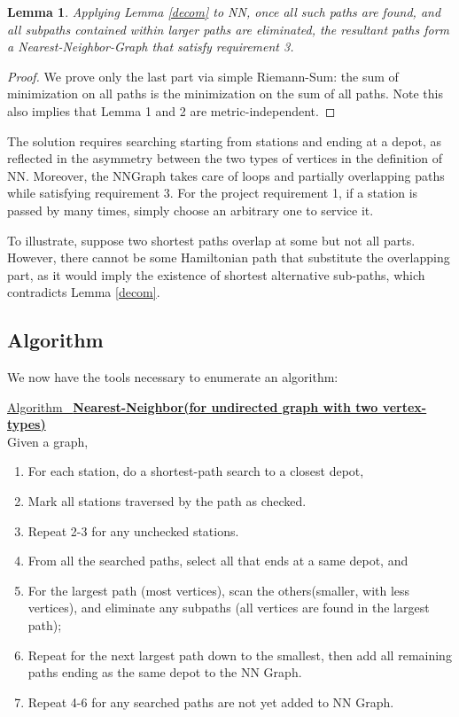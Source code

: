 \documentclass[12pt]{article}  %
\newtheorem{lemma}{Lemma}
\newcommand{\algtitle}[1]{\underline{Algorithm \ {\bf #1}} \vspace*{1mm}\\}
\begin{document}
\begin{lemma}
Applying Lemma \ref{decom} to NN, once all such paths are found, and all subpaths contained within larger paths are eliminated, the resultant paths form a Nearest-Neighbor-Graph that satisfy requirement 3.
\end{lemma}
\begin{proof}
We prove only the last part via simple Riemann-Sum: the sum of minimization on all paths is the minimization on the sum of all paths. Note this also implies that Lemma 1 and 2 are metric-independent.
\end{proof}

The solution requires searching starting from stations and ending at a depot, as reflected in the asymmetry between the two types of vertices in the definition of NN. Moreover, the NNGraph takes care of loops and partially overlapping paths while satisfying requirement 3. For the project requirement 1, if a station is passed by many times, simply choose an arbitrary one to service it.

To illustrate, suppose two shortest paths overlap at some but not all parts. However, there cannot be some Hamiltonian path that substitute the overlapping part, as it would imply the existence of shortest alternative sub-paths, which contradicts Lemma \ref{decom}.


\subsection{Algorithm}

We now have the tools necessary to enumerate an algorithm:

\algtitle{Nearest-Neighbor(for undirected graph with two vertex-types)}
Given a graph,
\begin{enumerate}
	\item For each station, do a shortest-path search to a closest depot,
	\item Mark all stations traversed by the path as checked.
	\item Repeat 2-3 for any unchecked stations.
	\item From all the searched paths, select all that ends at a same depot, and 
	\item For the largest path (most vertices), scan the others(smaller, with less vertices), and eliminate any subpaths (all vertices are found in the largest path);
	\item Repeat for the next largest path down to the smallest, then add all remaining paths ending as the same depot to the NN Graph.
	\item Repeat 4-6 for any searched paths are not yet added to NN Graph.
\end{enumerate}
\end{document}
